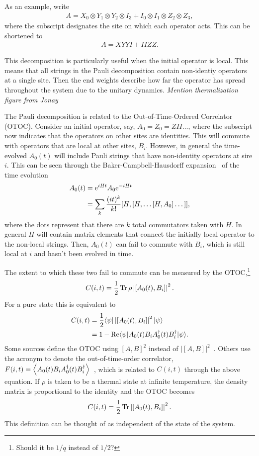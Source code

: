 As an example, write
\begin{align}
A = X_0\otimes Y_1\otimes Y_2\otimes I_3 + I_0\otimes I_1\otimes Z_2\otimes Z_3,
	\nonumber
\end{align}
where the subscript designates the site on which each operator acts. This can be shortened to
\begin{align}
A = XYYI + IIZZ\label{eqn:inioper}.
\end{align}

This decomposition is particularly useful when the initial operator is local. This means that all strings in the Pauli decomposition contain non-identiy operators at a single site. Then the end weights describe how far the operator has spread throughout the system due to the unitary dynamics. \emph{Mention thermalization} \emph{figure from Jonay}

The Pauli decomposition is related to the Out-of-Time-Ordered Correlator (OTOC). Consider an initial operator, say, $A_0=Z_0=ZII\dots$, where the subscript now indicates that the operators on other sites are identities. This will commute with operators that are local at other sites, $B_i$. However, in general the time-evolved $A_0(t)$ will include Pauli strings that have non-identity operators at sire $i$. This can be seen through the Baker-Campbell-Hausdorff expansion~\cite{Roberts2016} of the time evolution
\begin{align}
A_0(t) &= \text{e}^{iHt}A_0\text{e}^{-iHt} \nonumber\\
&= \sum_k\frac{(it)^k}{k!}[H,[H,\dots[H,A_0]\dots]],\label{eqn:BCH}
\end{align}
where the dots represent that there are $k$ total commutators taken with $H$.
In general $H$ will contain matrix elements that connect the initially local operator to the non-local strings. Then, $A_0(t)$ can fail to commute with $B_i$, which is still local at $i$ and hasn't been evolved in time.

The extent to which these two fail to commute can be measured by the OTOC,\footnote{Should it be $1/q$ instead of $1/2$?}
\begin{align}
C(i,t) = \frac{1}{2}\operatorname{Tr} \rho \left|[A_0(t),B_i]\right|^2.\nonumber
\end{align}
For a pure state this is equivalent to~\cite{Keyserlingk, Jonay}
\begin{align}
C(i,t) &= \frac{1}{2}\langle\psi|\left|[A_0(t),B_i]\right|^2|\psi\rangle\nonumber\\
&= 1-\operatorname{Re}\langle\psi|A_0(t)B_iA_0^\dag(t)B_i^\dag|\psi\rangle. \nonumber
\end{align}
Some sources define the OTOC using $[A,B]^2$ instead of $|[A,B]|^2$~\cite{Jonay, Roberts2016, Nahum2017}. Others use the acronym to denote the out-of-time-order correlator, $F(i,t) = \left\langle A_0(t)B_iA_0^\dag(t)B^\dag_i \right\rangle$~\cite{Who}, which is related to $C(i,t)$ through the above equation. If $\rho$ is taken to be a thermal state at infinite temperature, the density matrix is proportional to the identity and the OTOC becomes
\begin{align}
C(i,t) = \frac{1}{2}\operatorname{Tr} \left|[A_0(t),B_i]\right|^2.
\end{align}
This definition can be thought of as independent of the state of the system.

